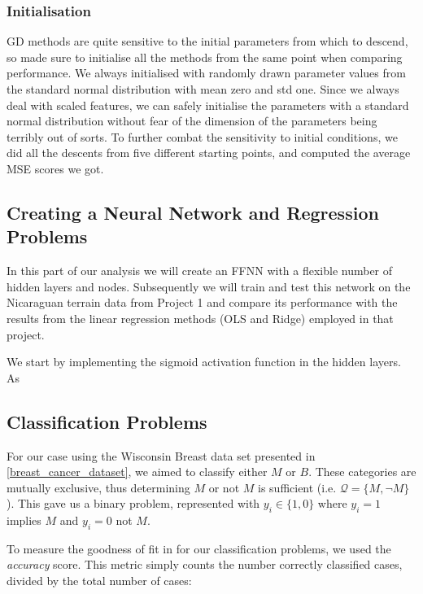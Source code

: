     \subsubsection{Initialisation}
        GD methods are quite sensitive to the initial parameters from which to descend, so made sure to initialise all the methods from the same point when comparing performance. We always initialised with randomly drawn parameter values from the standard normal distribution with mean zero and std one. Since we always deal with scaled features, we can safely initialise the parameters with a standard normal distribution without fear of the dimension of the parameters being terribly out of sorts. To further combat the sensitivity to initial conditions, we did all the descents from five different starting points, and computed the average MSE scores we got.

\subsection{Creating a Neural Network and Regression Problems}
    In this part of our analysis we will create an FFNN with a flexible number of hidden layers and nodes. Subsequently we will train and test this network on the Nicaraguan terrain data from Project 1 and compare its performance with the results from the linear regression methods (OLS and Ridge) employed in that project. 


    We start by implementing the sigmoid activation function in the hidden layers. As 

    
\subsection{Classification Problems}
    For our case using the Wisconsin Breast data set presented in \cref{breast_cancer_dataset}, we aimed to classify either $M$ or $B$. These categories are mutually exclusive, thus determining $M$ or not $M$ is sufficient (i.e. $\mathcal{Q} = \{ M, \neg M \}$). This gave us a binary problem, represented with $y_i \in \{ 1, 0 \}$ where $y_i = 1$ implies $M$ and $y_i = 0$ not $M$.

    To measure the goodness of fit in for our classification problems, we used the \textit{accuracy} score. This metric simply counts the number correctly classified cases, divided by the total number of cases:

